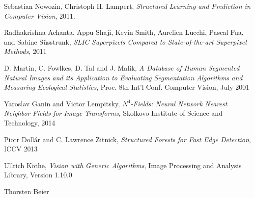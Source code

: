 
\manualmark
\markboth{\spacedlowsmallcaps{\bibname}}{\spacedlowsmallcaps{\bibname}} %
{}
\label{app:bibliography}




\begin{thebibliography}{9}

  Sebastian Nowozin, Christoph H. Lampert,
  \emph{Structured Learning and Prediction in Computer Vision},
  2011.
  
  Radhakrishna Achanta, Appu Shaji, Kevin Smith, Aurelien Lucchi, Pascal Fua, and Sabine Süsstrunk, 
  \emph{SLIC Superpixels Compared to State-of-the-art Superpixel Methods},
  2011
  
	D. Martin, C. Fowlkes, D. Tal and J. Malik,
	\emph{A Database of Human Segmented Natural Images and its
	           Application to Evaluating Segmentation Algorithms and
	           Measuring Ecological Statistics},
	Proc. 8th Int'l Conf. Computer Vision,
	July 2001		
	
	Yaroslav Ganin and Victor Lempitsky,
	\emph{$N^4$-Fields: Neural Network Nearest Neighbor Fields for Image Transforms},
	Skolkovo Institute of Science and Technology,
	2014
	
  Piotr Dollár and C. Lawrence Zitnick,
  \emph{Structured Forests for Fast Edge Detection},
  ICCV 2013
  
 	Ullrich Köthe,
 	\emph{Vision with Generic Algorithms},
 	Image Processing and Analysis Library,
 	Version 1.10.0
 	
 	Thorsten Beier


\end{thebibliography}

